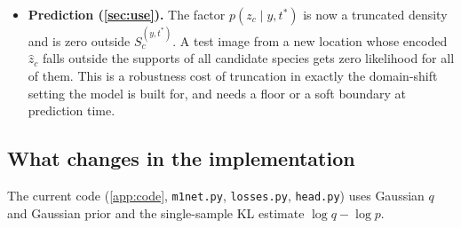 \begin{itemize}[leftmargin=1.5em]
      a four-node chain (\cref{tab:examples}) this leaves no slack: any region covered by fewer than all cells
      violates it. Style needs the analogous $K_R(z_s)$. R2 is therefore realistic only for small $n_c$ or
      for supports that overlap heavily.
\item \textbf{Prediction (\cref{sec:use}).} The factor $p(z_c\mid y,t^\ast)$ is now a truncated density and is
      zero outside $S_c^{(y,t^\ast)}$. A test image from a new location whose encoded $\hat z_c$ falls outside
      the supports of all candidate species gets zero likelihood for all of them. This is a robustness cost of
      truncation in exactly the domain-shift setting the model is built for, and needs a floor or a soft
      boundary at prediction time.
\end{itemize}

\subsection{What changes in the implementation}
\label{app:support:impl}
The current code (\cref{app:code}, \texttt{m1net.py}, \texttt{losses.py}, \texttt{head.py}) uses Gaussian
$q$ and Gaussian prior and the single-sample KL estimate $\log q-\log p$.

